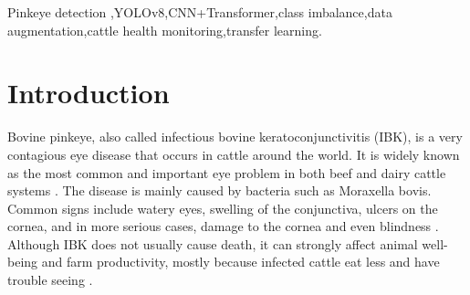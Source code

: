 \documentclass[preprint,12pt,authoryear]{elsarticle}
\begin{document}
\begin{frontmatter}
\begin{abstract}
Infectious bovine keratoconjunctivitis (IBK), commonly known as pinkeye, is a highly contagious ocular disease in cattle that causes significant welfare and economic losses. Early automated detection from farm images can enable timely veterinary intervention. We present a two-stage deep learning pipeline: \emph{Stage~1} localizes the eye region using a YOLOv8 detector, and \emph{Stage~2} classifies the cropped eye as healthy or pinkeye-positive using four architectures: ResNet18, EfficientNet-B0, a baseline CNN+Transformer hybrid, and an enhanced CNN+Transformer variant with a class token and deeper head. Evaluated on 394 labeled eye crops (309 healthy, 85 pinkeye) under stratified 5-fold cross-validation, the Strong CNN+Transformer achieves the highest mean accuracy (95.94\,\%) and the highest mean F1-score on the minority pinkeye class (90.51\,\%); ResNet18 attains the highest mean ROC-AUC (98.67\,\%) among the four models in the primary benchmark. Augmentation ablations show architecture-dependent gains and trade-offs. These results support eye-localized classification as a feasible screen for this imbalanced, fine-grained imaging setting.
\end{abstract}



\begin{keyword}
Pinkeye detection \sep YOLOv8\sep CNN+Transformer\sep class imbalance\sep data augmentation\sep cattle health monitoring\sep transfer learning.

\end{keyword}

\end{frontmatter}


\section{Introduction}
\label{intro}

Bovine pinkeye, also called infectious bovine keratoconjunctivitis (IBK), is a very contagious eye disease that occurs in cattle around the world. It is widely known as the most common and important eye problem in both beef and dairy cattle systems \citep{brown1998}. The disease is mainly caused by bacteria such as Moraxella bovis. Common signs include watery eyes, swelling of the conjunctiva, ulcers on the cornea, and in more serious cases, damage to the cornea and even blindness \citep{kizilkaya2013}. Although IBK does not usually cause death, it can strongly affect animal well-being and farm productivity, mostly because infected cattle eat less and have trouble seeing \citep{kizilkaya2013}.
\end{document}
